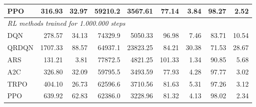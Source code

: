 \begin{samepage}
\begin{center}
\begin{tabular}{l|rr|rr|rr|rr}
    PPO          &   316.93 &    32.97 &    59210.2 &    3567.61 &   77.14 &    3.84 &   98.27 &    2.52 \\
    \midrule
    \multicolumn{9}{l}{\textit{RL methods trained for 1.000.000 steps}} \\
    \midrule
    DQN          &   278.57 &    34.13 &    74329.9 &    5050.33 &   96.98 &    7.46 &   83.71 &   10.54 \\
    QRDQN        &  1707.33 &    88.57 &    64937.1 &   23823.25 &   84.21 &   30.38 &   71.53 &   28.67 \\
    ARS          &   131.21 &     3.81 &    77872.5 &    4821.25 &  101.33 &    1.34 &   90.85 &    5.68 \\
    A2C          &   326.80 &    32.09 &    59795.5 &    3493.59 &   77.93 &    4.28 &   97.77 &    3.02 \\
    TRPO         &   404.10 &    26.73 &    62596.6 &    3710.56 &   81.63 &    5.31 &   97.26 &    3.12 \\
    PPO          &   639.92 &    62.83 &    62386.0 &    3228.96 &   81.32 &    4.13 &   98.02 &    2.34 \\
    \bottomrule
  \end{tabular}
\end{center}
\end{samepage}

